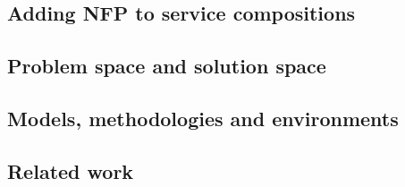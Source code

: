 \subsection{Adding NFP to service compositions}

\subsection{Problem space and solution space}

\subsection{Models, methodologies and environments}

\subsection{Related work}